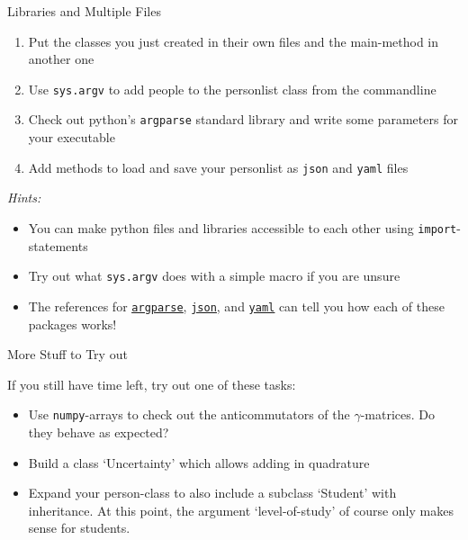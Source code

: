 \documentclass[10pt, aspectratio=169]{beamer}
\begin{document}
\begin{frame}{Libraries and Multiple Files}
  \begin{enumerate}
  \item
    Put the classes you just created in their own files and the main-method in another one
  \item
    Use \texttt{sys.argv} to add people to the personlist class from the commandline
  \item
    Check out python's \texttt{argparse} standard library and write some parameters for your executable
  \item
    Add methods to load and save your personlist as \texttt{json} and \texttt{yaml} files
  \end{enumerate}

  \textit{Hints:}
  \begin{itemize}
  \item
    You can make python files and libraries accessible to each other using \texttt{import}-statements
  \item
    Try out what \texttt{sys.argv} does with a simple macro if you are unsure
  \item
    The references for \href{https://docs.python.org/3/library/argparse.html}{\color{ugoelogodark}\uline{\texttt{argparse}}}, \href{https://docs.python.org/3/library/json.html}{\color{ugoelogodark}\uline{\texttt{json}}}, and \href{https://yaml.readthedocs.io/en/latest/}{\color{ugoelogodark}\uline{\texttt{yaml}}} can tell you how each of these packages works!
  \end{itemize}
\end{frame}

\begin{frame}{More Stuff to Try out}

  If you still have time left, try out one of these tasks:
  \begin{itemize}
  \item
    Use \texttt{numpy}-arrays to check out the anticommutators of the $\gamma$-matrices. Do they behave as expected?
  \item
    Build a class `Uncertainty' which allows adding in quadrature
  \item
    Expand your person-class to also include a subclass `Student' with inheritance. At this point, the argument `level-of-study' of course only makes sense for students.
  \end{itemize}

\end{frame}
\end{document}
